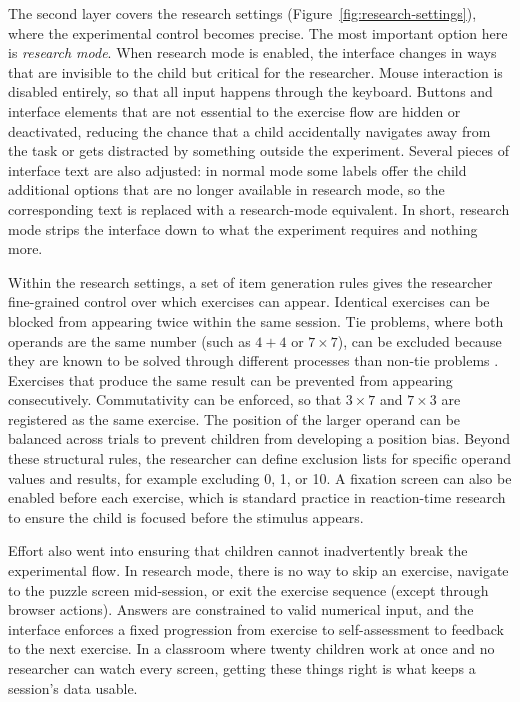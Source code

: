 The second layer covers the research settings (Figure~\ref{fig:research-settings}), where the experimental control becomes precise. The most important option here is \textit{research mode}. When research mode is enabled, the interface changes in ways that are invisible to the child but critical for the researcher. Mouse interaction is disabled entirely, so that all input happens through the keyboard. Buttons and interface elements that are not essential to the exercise flow are hidden or deactivated, reducing the chance that a child accidentally navigates away from the task or gets distracted by something outside the experiment. Several pieces of interface text are also adjusted: in normal mode some labels offer the child additional options that are no longer available in research mode, so the corresponding text is replaced with a research-mode equivalent. In short, research mode strips the interface down to what the experiment requires and nothing more.

Within the research settings, a set of item generation rules gives the researcher fine-grained control over which exercises can appear. Identical exercises can be blocked from appearing twice within the same session. Tie problems, where both operands are the same number (such as \(4+4\) or \(7 \times 7\)), can be excluded because they are known to be solved through different processes than non-tie problems \cite{campbell2002tie}. Exercises that produce the same result can be prevented from appearing consecutively. Commutativity can be enforced, so that \(3 \times 7\) and \(7 \times 3\) are registered as the same exercise. The position of the larger operand can be balanced across trials to prevent children from developing a position bias. Beyond these structural rules, the researcher can define exclusion lists for specific operand values and results, for example excluding 0, 1, or 10. A fixation screen can also be enabled before each exercise, which is standard practice in reaction-time research to ensure the child is focused before the stimulus appears.

Effort also went into ensuring that children cannot inadvertently break the experimental flow. In research mode, there is no way to skip an exercise, navigate to the puzzle screen mid-session, or exit the exercise sequence (except through browser actions). Answers are constrained to valid numerical input, and the interface enforces a fixed progression from exercise to self-assessment to feedback to the next exercise. In a classroom where twenty children work at once and no researcher can watch every screen, getting these things right is what keeps a session's data usable.

